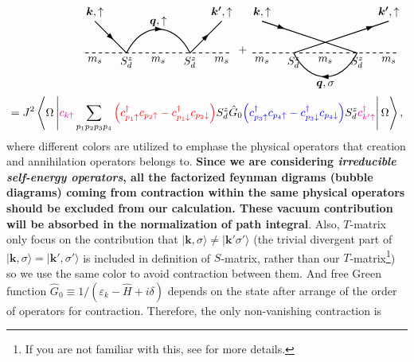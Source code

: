 \documentclass[aps,prx,superscriptaddress,onecolumn,preprintnumbers,nofootinbib,longbibliography]{revtex4-1}
\def\arrow{\tikz[scale=0.1,baseline=.1ex]{
	\draw[fill=black,rotate=-90] (-0.7,0)--(0,2)--(0.7,0);}
	}
\begin{document}
		\begin{align*}
			\begin{tikzpicture}[baseline]
				\draw[thick,dashed] (-2.3,0)--(2.3,0);
				\draw[thick] (-2,1)--(-1,0) .. controls (-0.5,1) and (0.5,1) ..(1,0)--(2,1);
				\node[below] at (2,0) {$m_s$};
				\node[below] at (-2,0) {$m_s$};
				\node[below] at (0,0) {$m_s$};
				\node[below] at (1,0) {$S_d^z$};
				\node[below] at (-1,0) {$S_d^z$};
				\node[rotate=-45] at (-1.5,0.5) {\arrow};
				\node at (0,0.75) {\arrow};
				\node at (0,1) {$\bm{q},\uparrow$};
				\node[above] at (-2,1) {$\bm{k},\uparrow$};
				\node[above] at (2,1) {$\bm{k'},\uparrow$};
				\node[rotate=45] at (1.5,0.5) {\arrow};
			\end{tikzpicture}+\begin{tikzpicture}[baseline]
				\draw[thick,dashed] (-2.3,0)--(2.3,0);
				\draw[thick] (-2,1)--(1,0) .. controls (0.5,-1) and (-0.5,-1) .. (-1,0)--(2,1);
				\node[below] at (2,0) {$m_s$};
				\node[below] at (-2,0) {$m_s$};
				\node[below] at (0,0) {$m_s$};
				\node[below] at (1,0) {$S_d^z$};
				\node[below] at (-1,0) {$S_d^z$};
				\node[rotate=-20] at (-1.4,0.8) {\arrow};
				\node[rotate=180] at (0,-0.75) {\arrow};
				\node at (0,-1) {$\bm{q},\sigma$};
				\node[above] at (-2,1) {$\bm{k},\uparrow$};
				\node[above] at (2,1) {$\bm{k'},\uparrow$};
				\node[rotate=20] at (1.4,0.8) {\arrow};
			\end{tikzpicture}\\= J^2\left\langle\Omega\left|{\color{magenta}c_{k\uparrow}}\sum_{p_1p_2p_3p_4}{\color{red}\left(c_{p_1\uparrow}^\dagger c_{p_2\uparrow}-c_{p_1\downarrow}^\dagger c_{p_2\downarrow}\right)}S_d^z \hat{G}_0{\color{blue}\left(c_{p_3\uparrow}^\dagger c_{p_4\uparrow}-c_{p_3\downarrow}^\dagger c_{p_4\downarrow}\right)}S_d^z{\color{magenta}c_{k'\uparrow}^\dagger}\right|\Omega\right\rangle,
		\end{align*}
		where different colors are utilized to emphase the physical operators that creation and annihilation operators belongs to. \textbf{Since we are considering \emph{irreducible self-energy operators}, all the factorized feynman digrams (bubble diagrams) coming from contraction within the same physical operators should be excluded from our calculation. These vacuum contribution will be absorbed in the normalization of path integral}. Also, $T$-matrix only focus on the contribution that $|\bm{k},\sigma\rangle\neq|\bm{k'}\sigma'\rangle$ (the trivial divergent part of $|\bm{k},\sigma\rangle=|\bm{k'},\sigma'\rangle$ is included in definition of $S$-matrix, rather than our $T$-matrix\footnote{If you are not familiar with this, see \cite{weinberg1995quantum} for more details.}) so we use the same color to avoid contraction between them. And free Green function $\hat{G}_0\equiv1/(\varepsilon_k-\hat{H}+i\delta)$ depends on the state after arrange of the order of operators for contraction. Therefore, the only non-vanishing contraction is
\end{document}
